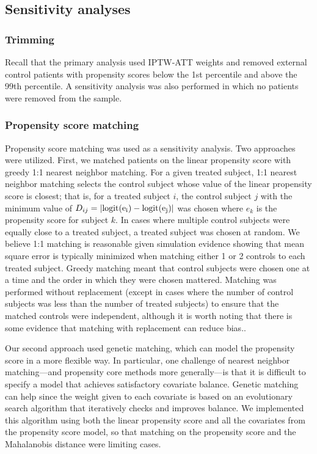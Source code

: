 \documentclass[11pt,final,fleqn]{article}\usepackage[]{graphicx}\usepackage[]{color}
\begin{document}
\subsection{Sensitivity analyses}

\subsubsection{Trimming}
Recall that the primary analysis used IPTW-ATT weights and removed external control patients with propensity scores below the 1st percentile and above the 99th percentile. A sensitivity analysis was also performed in which no patients were removed from the sample.

\subsubsection{Propensity score matching}
Propensity score matching was used as a sensitivity analysis. Two approaches were utilized. First, we matched patients on the linear propensity score with greedy 1:1 nearest neighbor matching. For a given treated subject, 1:1 nearest neighbor matching selects the control subject whose value of the linear propensity score is closest; that is, for a treated subject $i$, the control subject $j$ with the minimum value of $D_{ij}=|\rm{logit}(e_i)-\rm{logit}(e_j)|$ was chosen where $e_{k}$ is the propensity score for subject $k$. In cases where multiple control subjects were equally close to a treated subject, a treated subject was chosen at random. We believe 1:1 matching is reasonable given simulation evidence showing that mean square error is typically minimized when matching either 1 or 2 controls to each treated subject.\cite{austin2010statistical} Greedy matching meant that control subjects were chosen one at a time and the order in which they were chosen mattered. Matching was performed without replacement (except in cases where the number of control subjects was less than the number of treated subjects) to ensure that the matched controls were independent, although it is worth noting that there is some evidence that matching with replacement can reduce bias.\cite{abadie2006large, stuart2010matching}.

Our second approach used genetic matching, which can model the propensity score in a more flexible way.\cite{sekhon2008multivariate, diamond2013genetic}  In particular, one challenge of nearest neighbor matching---and propensity core methods more generally---is that it is difficult to specify a model that achieves satisfactory covariate balance. Genetic matching can help since the weight given to each covariate is based on an evolutionary search algorithm that iteratively checks and improves balance. We implemented this algorithm using both the linear propensity score and all the covariates from the propensity score model, so that matching on the propensity score and the Mahalanobis distance were limiting cases.
\end{document}
